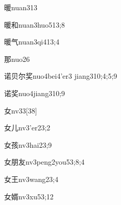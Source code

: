 \begin{verbete}{暖}{nuan3}{13}
\end{verbete}

\begin{verbete}{暖和}{nuan3huo5}{13;8}
\end{verbete}

\begin{verbete}{暖气}{nuan3qi4}{13;4}
\end{verbete}

\begin{verbete}{那}{nuo2}{6}
\end{verbete}

\begin{verbete}{诺贝尔奖}{nuo4bei4'er3 jiang3}{10;4;5;9}
\end{verbete}

\begin{verbete}{诺奖}{nuo4jiang3}{10;9}
\end{verbete}

\begin{verbete}{女}{nv3}{3}[38]
\end{verbete}

\begin{verbete}{女儿}{nv3'er2}{3;2}
\end{verbete}

\begin{verbete}{女孩}{nv3hai2}{3;9}
\end{verbete}

\begin{verbete}{女朋友}{nv3peng2you5}{3;8;4}
\end{verbete}

\begin{verbete}{女王}{nv3wang2}{3;4}
\end{verbete}

\begin{verbete}{女婿}{nv3xu5}{3;12}
\end{verbete}


